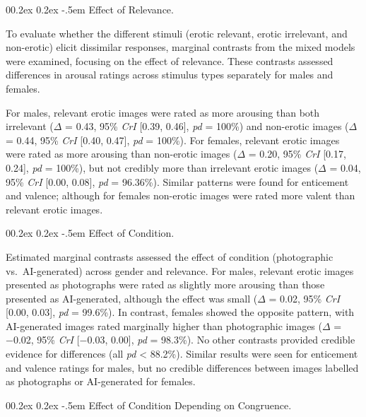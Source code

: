 \documentclass[
  jou,
  floatsintext,
  longtable,
  nolmodern,
  notxfonts,
  notimes,
  colorlinks=true,linkcolor=blue,citecolor=blue,urlcolor=blue]{apa7}
\makeatletter
\renewcommand{\paragraph}{\@startsection{paragraph}{4}{\parindent}%
	{0\baselineskip \@plus 0.2ex \@minus 0.2ex}%
	{-.5em}%
	{\normalfont\normalsize\bfseries\typesectitle}}
\makeatother
\begin{document}
\paragraph{Effect of Relevance.}\label{effect-of-relevance}

To evaluate whether the different stimuli (erotic relevant, erotic
irrelevant, and non-erotic) elicit dissimilar responses, marginal
contrasts from the mixed models were examined, focusing on the effect of
relevance. These contrasts assessed differences in arousal ratings
across stimulus types separately for males and females.

For males, relevant erotic images were rated as more arousing than both
irrelevant (\(\Delta\) = 0.43, 95\% \emph{CrI} {[}0.39, 0.46{]},
\emph{pd} = 100\%) and non-erotic images (\(\Delta\) = 0.44, 95\%
\emph{CrI} {[}0.40, 0.47{]}, \emph{pd} = 100\%). For females, relevant
erotic images were rated as more arousing than non-erotic images
(\(\Delta\) = 0.20, 95\% \emph{CrI} {[}0.17, 0.24{]}, \emph{pd} =
100\%), but not credibly more than irrelevant erotic images (\(\Delta\)
= 0.04, 95\% \emph{CrI} {[}0.00, 0.08{]}, \emph{pd} = 96.36\%). Similar
patterns were found for enticement and valence; although for females
non-erotic images were rated more valent than relevant erotic images.

\paragraph{Effect of Condition.}\label{effect-of-condition}

Estimated marginal contrasts assessed the effect of condition
(photographic vs.~AI-generated) across gender and relevance. For males,
relevant erotic images presented as photographs were rated as slightly
more arousing than those presented as AI-generated, although the effect
was small (\(\Delta\) = 0.02, 95\% \emph{CrI} {[}0.00, 0.03{]},
\emph{pd} = 99.6\%). In contrast, females showed the opposite pattern,
with AI-generated images rated marginally higher than photographic
images (\(\Delta\) = −0.02, 95\% \emph{CrI} {[}−0.03, 0.00{]}, \emph{pd}
= 98.3\%). No other contrasts provided credible evidence for differences
(all \emph{pd} \textless{} 88.2\%). Similar results were seen for
enticement and valence ratings for males, but no credible differences
between images labelled as photographs or AI-generated for females.

\paragraph{Effect of Condition Depending on
Congruence.}\label{effect-of-condition-depending-on-congruence}
\end{document}
